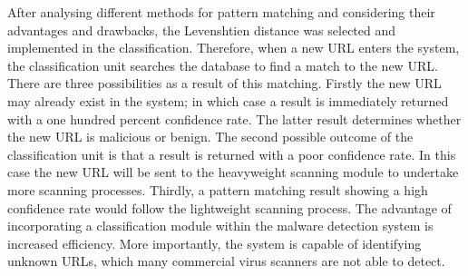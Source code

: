 After analysing different methods for pattern matching and considering their advantages and drawbacks, the Levenshtien distance was selected and implemented in the classification.  Therefore, when a new URL enters the system, the classification unit searches the database to find a match to the new URL. There are three possibilities as a result of this matching. Firstly the new URL may already exist in the system; in which case a result is immediately returned with a one hundred percent confidence rate. The latter result determines whether the new URL is malicious or benign. The second possible outcome of the classification unit is that a result is returned with a poor confidence rate. In this case the new URL will be sent to the heavyweight scanning module to undertake more scanning processes. Thirdly, a pattern matching result showing a high confidence rate would follow the lightweight scanning process.
The advantage of incorporating a classification module within the malware detection system is increased efficiency. More importantly, the system is capable of identifying unknown URLs, which many commercial virus scanners are not able to detect. 
